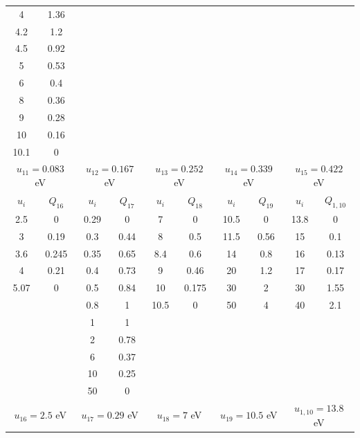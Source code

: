 \documentclass{report}
\begin{document}
\begin{tabular}{|c|c||c|c||c|c||c|c||c|c|}
4     & 1.36 &       &      &       &      &      &      &      &      \\ 
4.2   & 1.2  &       &      &       &      &      &      &      &      \\ 
4.5   & 0.92 &       &      &       &      &      &      &      &      \\ 
5     & 0.53 &       &      &       &      &      &      &      &      \\ 
6     & 0.4  &       &      &       &      &      &      &      &      \\ 
8     & 0.36 &       &      &       &      &      &      &      &      \\ 
9     & 0.28 &       &      &       &      &      &      &      &      \\ 
10    & 0.16 &       &      &       &      &      &      &      &      \\ 
10.1  & 0    &       &      &       &      &      &      &      &      \\
\multicolumn{2}{|c||}{$u_{11}=0.083$ eV} &
\multicolumn{2}{c||}{$u_{12}=0.167$ eV} &
\multicolumn{2}{c||}{$u_{13}=0.252$ eV} &
\multicolumn{2}{c||}{$u_{14}=0.339$ eV} &
\multicolumn{2}{c|}{$u_{15}=0.422$ eV}\\
\hline
\hline 
$u_i$ & $Q_{16}$ & $u_i$ & $Q_{17}$ & $u_i$ & $Q_{18}$ & $u_i$ & $Q_{19}$ & $u_i$ & $Q_{1,10}$ \\                                                                             
\hline
2.5  & 0     & 0.29 & 0    & 7    & 0     & 10.5 & 0    & 13.8 & 0    \\
3    & 0.19  & 0.3  & 0.44 & 8    & 0.5   & 11.5 & 0.56 & 15   & 0.1  \\
3.6  & 0.245 & 0.35 & 0.65 & 8.4  & 0.6   & 14   & 0.8  & 16   & 0.13 \\
4    & 0.21  & 0.4  & 0.73 & 9    & 0.46  & 20   & 1.2  & 17   & 0.17 \\
5.07 & 0     & 0.5  & 0.84 & 10   & 0.175 & 30   & 2    & 30   & 1.55 \\
     &       & 0.8  & 1    & 10.5 & 0     & 50   & 4    & 40   & 2.1  \\
     &       & 1    & 1    &      &       &      &      &      &      \\
     &       & 2    & 0.78 &      &       &      &      &      &      \\
     &       & 6    & 0.37 &      &       &      &      &      &      \\
     &       & 10   & 0.25 &      &       &      &      &      &      \\
     &       & 50   & 0    &      &       &      &      &      &      \\
\multicolumn{2}{|c||}{$u_{16}=2.5$ eV} &
\multicolumn{2}{c||}{$u_{17}=0.29$ eV} &
\multicolumn{2}{c||}{$u_{18}=7$ eV} &
\multicolumn{2}{c||}{$u_{19}=10.5$ eV} &
\multicolumn{2}{c|}{$u_{1,10}=13.8$ eV}\\
\hline 
\end{tabular}
\end{document}
